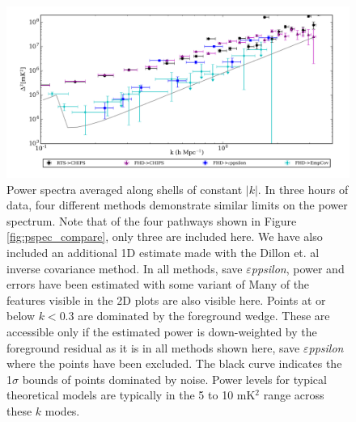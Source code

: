\documentclass[twolcolumn,iop]{emulateapj}
\def\eppsilon{{\it $\varepsilon$ppsilon}}
\begin{document}
\begin{figure}[h!]

\includegraphics[width=\textwidth]{figures/MWA_PS_Compare/MWAPipeline_compare_1d_radial_logbryna.png}
\caption{Power spectra averaged along shells of constant $|k|$. In three hours of data, four different methods demonstrate similar limits on the power spectrum. Note that of the four pathways shown in Figure \ref{fig:pspec_compare}, only three are included here. We have also included an additional 1D estimate made with the Dillon et. al inverse covariance method. In all methods, save \eppsilon{}, power and errors have been estimated with some variant of Many of the features visible in the 2D plots are also visible here. Points at or below $k<0.3$ are dominated by the foreground wedge. These are accessible only if the estimated power is down-weighted by the foreground residual as it is in all methods shown here, save \eppsilon{} where the points have been excluded. The black curve indicates the 1$\sigma$ bounds of points dominated by noise.  Power levels for typical theoretical models are typically in the 5 to 10 mK$^2$ range across these $k$ modes.
\label{fig:1D_pspecs}}

\end{figure}
\end{document}
